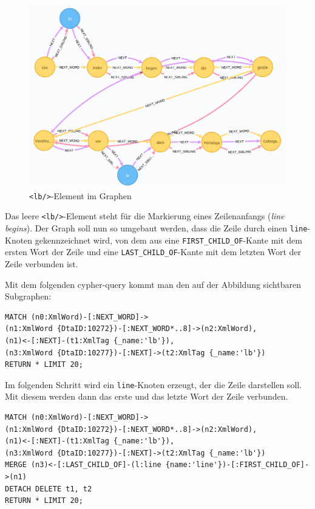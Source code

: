 \documentclass[ngerman,]{scrreprt}
\begin{document}
\begin{figure}
\centering
\includegraphics{Bilder/TEI2Graph/lb-im-Graph2.png}
\caption{\texttt{\textless{}lb/\textgreater{}}-Element im Graphen}
\end{figure}

Das leere \texttt{\textless{}lb/\textgreater{}}-Element steht für die Markierung eines Zeilenanfangs (\emph{line begins}). Der Graph soll nun so umgebaut werden, dass die Zeile durch einen \texttt{line}-Knoten gekennzeichnet wird, von dem aus eine \texttt{FIRST\_CHILD\_OF}-Kante mit dem ersten Wort der Zeile und eine \texttt{LAST\_CHILD\_OF}-Kante mit dem letzten Wort der Zeile verbunden ist.

Mit dem folgenden cypher-query kommt man den auf der Abbildung sichtbaren Subgraphen:

\begin{verbatim}
MATCH (n0:XmlWord)-[:NEXT_WORD]->
(n1:XmlWord {DtaID:10272})-[:NEXT_WORD*..8]->(n2:XmlWord),
(n1)<-[:NEXT]-(t1:XmlTag {_name:'lb'}),
(n3:XmlWord {DtaID:10277})-[:NEXT]->(t2:XmlTag {_name:'lb'})
RETURN * LIMIT 20;
\end{verbatim}

Im folgenden Schritt wird ein \texttt{line}-Knoten erzeugt, der die Zeile darstellen soll. Mit diesem werden dann das erste und das letzte Wort der Zeile verbunden.

\begin{verbatim}
MATCH (n0:XmlWord)-[:NEXT_WORD]->
(n1:XmlWord {DtaID:10272})-[:NEXT_WORD*..8]->(n2:XmlWord),
(n1)<-[:NEXT]-(t1:XmlTag {_name:'lb'}),
(n3:XmlWord {DtaID:10277})-[:NEXT]->(t2:XmlTag {_name:'lb'})
MERGE (n3)<-[:LAST_CHILD_OF]-(l:line {name:'line'})-[:FIRST_CHILD_OF]->(n1)
DETACH DELETE t1, t2
RETURN * LIMIT 20;
\end{verbatim}
\end{document}
